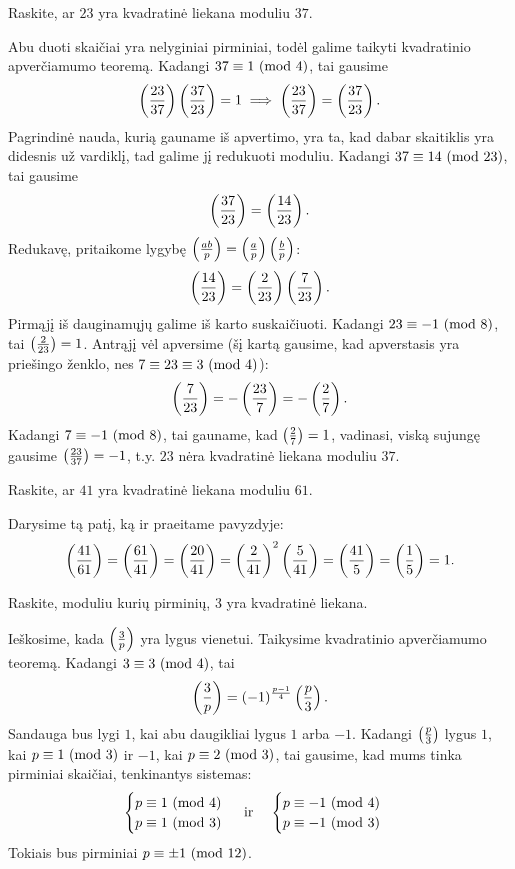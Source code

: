 \begin{pavnr}
  Raskite, ar $23$ yra kvadratinė liekana moduliu $37$.
\end{pavnr}

\begin{sprendimas}
  Abu duoti skaičiai yra nelyginiai pirminiai, todėl galime taikyti
  kvadratinio apverčiamumo teoremą. Kadangi $37 \equiv 1 \ (\text{mod } 4)$, tai
  gausime
  $$\left(\frac{23}{37}\right)\left(\frac{37}{23}\right) = 1\implies \left(\frac{23}{37}\right) = \left(\frac{37}{23}\right).$$
  Pagrindinė nauda, kurią gauname iš apvertimo, yra ta, kad dabar skaitiklis
  yra didesnis už vardiklį, tad galime jį redukuoti moduliu. Kadangi $37
  \equiv 14 \ (\text{mod } 23)$, tai gausime $$\left(\frac{37}{23}\right) = \left(\frac{14}{23}\right).$$ 
  Redukavę, pritaikome lygybę $\left(\frac{ab}{p}\right) = \left(\frac{a}{p}\right)
  \left(\frac{b}{p}\right)$: $$\left(\frac{14}{23}\right) = \left(\frac{2}{23}\right) \left(\frac{7}{23}\right).$$
  Pirmąjį iš dauginamųjų galime iš karto suskaičiuoti. Kadangi $23 \equiv
  -1 \ (\text{mod } 8)$, tai $\left(\frac{2}{23}\right)=1$. Antrąjį vėl apversime (šį kartą gausime,
  kad apverstasis yra priešingo ženklo, nes $7 \equiv 23 \equiv 3 \ (\text{mod } 4)$):
  $$\left(\frac{7}{23}\right) = -\left(\frac{23}{7}\right) = -\left(\frac{2}{7}\right).$$ 
  Kadangi $7 \equiv -1\ (\text{mod } 8)$, tai gauname, kad $\left(\frac{2}{7}\right)=1$, vadinasi,
  viską sujungę gausime $\left(\frac{23}{37}\right)=-1$, t.y. $23$ nėra kvadratinė
  liekana moduliu $37$.
\end{sprendimas}

\begin{pavnr}
  Raskite, ar $41$ yra kvadratinė liekana moduliu $61$.
\end{pavnr}

\begin{sprendimas}
  Darysime tą patį, ką ir praeitame pavyzdyje:
  $$\left(\frac{41}{61}\right)=\left(\frac{61}{41}\right)=\left(\frac{20}{41}\right)=\left(\frac{2}{41}\right)^2\left(\frac{5}{41}\right)=\left(\frac{41}{5}\right)=\left(\frac{1}{5}\right)
  = 1.$$
\end{sprendimas}

\begin{pavnr}
  Raskite, moduliu kurių pirminių, $3$ yra kvadratinė liekana.
\end{pavnr}

\begin{sprendimas}
  Ieškosime, kada $\left(\frac{3}{p}\right)$ yra lygus vienetui. Taikysime kvadratinio
  apverčiamumo teoremą. Kadangi $3 \equiv 3 \ (\text{mod } 4)$, tai
  $$\left(\frac{3}{p}\right) = (-1)^\frac{p-1}{4}\left(\frac{p}{3}\right).$$
  Sandauga bus lygi $1$, kai abu daugikliai lygus $1$ arba $-1$. Kadangi
  $\left(\frac{p}{3}\right)$ lygus $1$, kai $p\equiv 1\ (\text{mod } 3)$ ir $-1$, kai $p\equiv
  2\ (\text{mod } 3)$, tai gausime, kad mums tinka pirminiai skaičiai, tenkinantys
  sistemas:
  $$\begin{cases}
    p \equiv 1 \ (\text{mod } 4)\\
    p \equiv 1 \ (\text{mod } 3)
  \end{cases}
  \text{ ir } \phantom{ir}
  \begin{cases}
    p\equiv -1 \ (\text{mod } 4)\\
    p\equiv -1 \ (\text{mod } 3)
  \end{cases}$$
  Tokiais bus pirminiai $p\equiv \pm 1 \ (\text{mod } 12)$.
\end{sprendimas}

